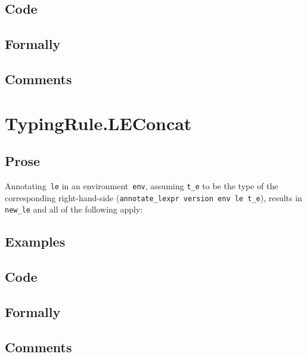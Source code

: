 \documentclass{book}
\begin{document}
  \subsection{Code}

  \subsection{Formally}

  \subsection{Comments}

\section{TypingRule.LEConcat \label{sec:TypingRule.LEConcat}}

    \subsection{Prose}
   Annotating~\texttt{le} in an environment~\texttt{env}, assuming
\texttt{t\_e} to be the type of the corresponding right-hand-side
(\texttt{annotate\_lexpr version env le t\_e}), results in \texttt{new\_le} and
all of the following apply:
     
  \subsection{Examples}

  \subsection{Code}

  \subsection{Formally}

  \subsection{Comments}
\end{document}
